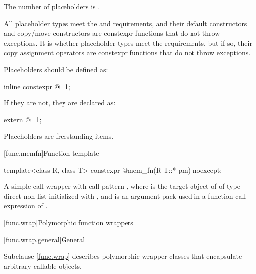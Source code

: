 \pnum
The number  of placeholders is
.

\pnum
All placeholder types meet the  and
 requirements, and
their default constructors and copy/move
constructors are constexpr functions that
do not throw exceptions. It is  whether
placeholder types meet the  requirements,
but if so, their copy assignment operators are
constexpr functions that do not throw exceptions.

\pnum
Placeholders should be defined as:
\begin{codeblock}
inline constexpr @\unspec@ _1{};
\end{codeblock}
If they are not, they are declared as:
\begin{codeblock}
extern @\unspec@ _1;
\end{codeblock}%

\pnum
{}%
Placeholders are freestanding items.

[func.memfn]{Function template }%

%
\begin{itemdecl}
template<class R, class T> constexpr @\unspec@ mem_fn(R T::* pm) noexcept;
\end{itemdecl}

\begin{itemdescr}
\pnum
\returns
A simple call wrapper 
with call pattern , where
 is the target object of  of type 
direct-non-list-initialized with , and
 is an argument pack
used in a function call expression of .
\end{itemdescr}

[func.wrap]{Polymorphic function wrappers}%

[func.wrap.general]{General}%

\pnum
Subclause \ref{func.wrap} describes polymorphic wrapper classes that
encapsulate arbitrary callable objects.

